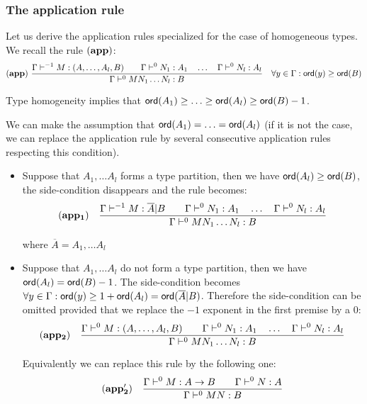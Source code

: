 \subsubsection{The application rule} Let us derive the
application rules specialized for the case of homogeneous types. We
recall the rule $\mathbf{(app)}$:
$$ \mathbf{(app)} \  \frac{\displaystyle \Gamma \vdash^{-1} M : (A,\ldots,A_l,B)
                                        \qquad \Gamma \vdash^{0} N_1 : A_1
                                        \quad \ldots \quad \Gamma \vdash^{0} N_l : A_l  }{\Gamma  \vdash^0 M N_1 \ldots N_l : B}
                                    \quad
                                   \forall y \in \Gamma : {\sf ord}(y) \geq {\sf ord}(B)$$

Type homogeneity implies that ${\sf ord}(A_1) \geq \ldots \geq {\sf ord}(A_l)
\geq {\sf ord}(B) - 1$.

We can make the assumption that ${\sf ord}(A_1) = \ldots = {\sf ord}(A_l)$ (if it is not the case,
we can replace the application rule by several consecutive application rules
respecting this condition).


\begin{itemize}
\item Suppose that $A_1, \ldots A_l$ forms a type partition, then we
have ${\sf ord}(A_l) \geq {\sf ord}(B)$, the side-condition disappears and
the rule becomes:
$$ \mathbf{(app_1)} \quad  \frac{\displaystyle \Gamma \vdash^{-1} M : \overline{A} | B
                                        \qquad \Gamma \vdash^{0} N_1 :
                                        A_1
                                        \quad \ldots \quad \Gamma \vdash^{0} N_l :
                                        A_l
                                        }{\Gamma  \vdash^{0} M N_1 \ldots N_l : B}
$$

where $\overline{A} = A_1, \ldots A_l$

\item  Suppose that $A_1, \ldots A_l$ do not form a type partition, then we
have ${\sf ord}(A_l) = {\sf ord}(B) - 1$. The side-condition becomes
$\forall y \in \Gamma : {\sf ord}(y) \geq 1 +{\sf ord}(A_l) = {\sf ord}(\overline{A}|B)$. Therefore the side-condition
can be omitted provided that we replace the $-1$ exponent in the first premise by a $0$:
$$ \mathbf{(app_2)} \quad  \frac{\displaystyle \Gamma \vdash^0 M : (A,\ldots,A_l,B)
                                        \qquad \Gamma \vdash^{0} N_1 : A_1
                                        \quad \ldots
                                        \quad \Gamma \vdash^{0} N_l : A_l
                                   }{\Gamma  \vdash^0 M N_1 \ldots N_l : B}
$$

Equivalently we can replace this rule by the following one:
$$ \mathbf{(app_2')} \quad  \frac{\displaystyle \Gamma \vdash^0 M : A\rightarrow B
                                        \qquad \Gamma \vdash^{0} N : A }{\Gamma  \vdash^{0} M N : B}$$
\end{itemize}

